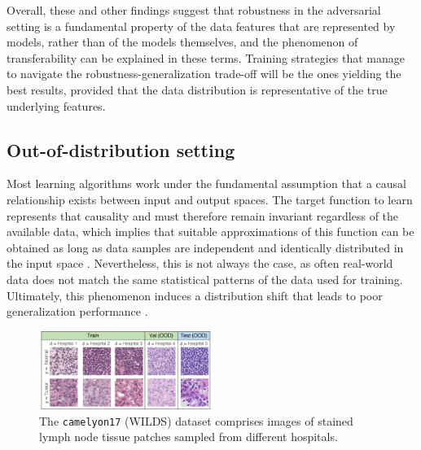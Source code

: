 Overall, these and other findings suggest that robustness in the adversarial setting
is a fundamental property of the data features that are represented by models, 
rather than of the models themselves, and the phenomenon of transferability can be
explained in these terms. Training strategies that manage to navigate the 
robustness-generalization trade-off will be the ones yielding 
the best results, provided that the data distribution
is representative of the true underlying features. 

\subsection{Out-of-distribution setting}\label{sec:intro_ood}

Most learning algorithms work under the fundamental assumption that
a causal relationship exists between input and output spaces. The target function to 
learn represents that causality and must therefore remain 
invariant regardless of the available data, which implies that 
suitable approximations of this 
function can be obtained as long as data samples are independent 
and identically distributed in the input space
\cite{muandetDomainGeneralizationInvariant2013,quinonero-candelaDatasetShiftMachine2009}. 
Nevertheless, this is not always
the case, as often real-world data does not match the same statistical
patterns of the data used for training. Ultimately, this phenomenon induces a
distribution shift that leads to poor generalization performance
\cite{zhouDomainGeneralizationSurvey2022,wangGeneralizingUnseenDomains2022,liuOutOfDistributionGeneralizationSurvey2023}. \\

\begin{figure}[h]
    \centering
    \includegraphics[width=0.5\textwidth]{img/introduction/camelyon17.png}
    \caption{The \texttt{camelyon17} (WILDS) dataset comprises images of stained 
    lymph node tissue patches sampled from different hospitals.
    \cite{kohWILDSBenchmarkIntheWild2021}
    }
    \label{fig:camelyon17}
\end{figure}

